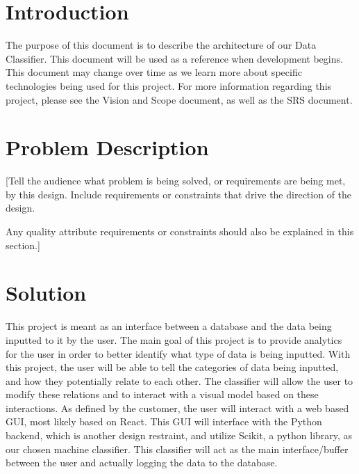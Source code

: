 \documentclass[12pt,oneside,letterpaper]{article}
\begin{document}
\newpage

\section{Introduction}

The purpose of this document is to describe the architecture of our Data Classifier. This document will be used as a reference when development begins. This document may change over time as we learn more about specific technologies being used for this project. For more information regarding this project, please see the Vision and Scope document, as well as the SRS document.

\section{Problem Description}
[Tell the audience what problem is being solved, or requirements are being met, by this design.  Include requirements or constraints that drive the direction of the design.

Any quality attribute requirements or constraints should also be explained in this section.]



\section{Solution}
This project is meant as an interface between a database and the data being inputted to it by the user. The main goal of this project is to provide analytics for the user in order to better identify what type of data is being inputted. With this project, the user will be able to tell the categories of data being inputted, and how they potentially relate to each other. The classifier will allow the user to modify these relations and to interact with a visual model based on these interactions. As defined by the customer, the user will interact with a web based GUI, most likely based on React. This GUI will interface with the Python backend, which is another design restraint, and utilize Scikit, a python library, as our chosen machine classifier. This classifier will act as the main interface/buffer between the user and actually logging the data to the database. 
\end{document}
